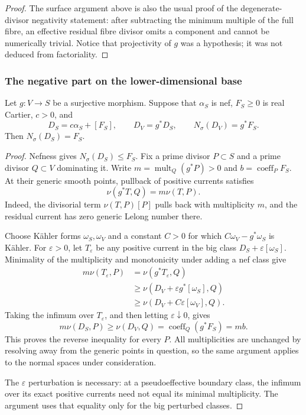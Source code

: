 \begin{proof}
The surface argument above is also the usual proof of the
degenerate-divisor negativity statement: after subtracting the minimum
multiple of the full fibre, an effective residual fibre divisor omits
a component and cannot be numerically trivial. Notice that projectivity
of $g$ was a hypothesis; it was not deduced from factoriality.
\end{proof}

\subsubsection{The negative part on the lower-dimensional base}

\begin{lemma}
\label{prog:negative-part-base}
Let $g:V\to S$ be a surjective morphism. Suppose that $\alpha_S$ is nef,
$F_S\geq0$ is real Cartier, $c>0$, and
\[
 D_S=c\alpha_S+[F_S],\qquad D_V=g^*D_S,\qquad
 N_\sigma(D_V)=g^*F_S.
\]
Then $N_\sigma(D_S)=F_S$.
\end{lemma}

\begin{proof}
Nefness gives $N_\sigma(D_S)\leq F_S$. Fix a prime divisor $P\subset S$
and a prime divisor $Q\subset V$ dominating it. Write
$m=\operatorname{mult}_Q(g^*P)>0$ and $b=\operatorname{coeff}_P F_S$.
At their generic smooth points, pullback of positive currents satisfies
\[
                         \nu(g^*T,Q)=m\nu(T,P).
\]
Indeed, the divisorial term $\nu(T,P)[P]$ pulls back with multiplicity
$m$, and the residual current has zero generic Lelong number there.

Choose K\"ahler forms $\omega_S,\omega_V$ and a constant $C>0$ for which
$C\omega_V-g^*\omega_S$ is K\"ahler. For $\varepsilon>0$, let $T_\varepsilon$
be any positive current in the big class $D_S+\varepsilon[\omega_S]$.
Minimality of the multiplicity and monotonicity under adding a nef
class give
\begin{align*}
 m\nu(T_\varepsilon,P)
 &=\nu(g^*T_\varepsilon,Q)\\
 &\geq\nu(D_V+\varepsilon g^*[\omega_S],Q)\\
 &\geq\nu(D_V+C\varepsilon[\omega_V],Q).
\end{align*}
Taking the infimum over $T_\varepsilon$, and then letting
$\varepsilon\downarrow0$, gives
\[
 m\nu(D_S,P)\geq\nu(D_V,Q)
                 =\operatorname{coeff}_Q(g^*F_S)=mb.
\]
This proves the reverse inequality for every $P$.
All multiplicities are unchanged by resolving away from the generic
points in question, so the same argument applies to the normal spaces
under consideration.

The $\varepsilon$ perturbation is necessary: at a pseudoeffective
boundary class, the infimum over its exact positive currents need not
equal its minimal multiplicity. The argument uses that equality only
for the big perturbed classes.
\end{proof}

